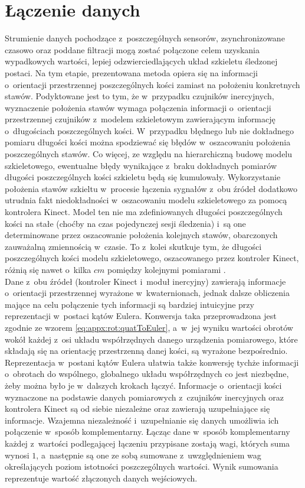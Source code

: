 \section{Łączenie danych}

Strumienie danych pochodzące z~poszczegółnych sensorów, zsynchronizowane czasowo oraz poddane filtracji mogą zostać połączone celem uzyskania wypadkowych wartości, lepiej odzwierciedlających układ szkieletu śledzonej postaci. Na tym etapie, prezentowana metoda opiera się na informacji o~orientacji przestrzennej poszczególnych kości zamiast na położeniu konkretnych stawów. Podyktowane jest to tym, że w~przypadku czujników inercyjnych, wyznaczenie położenia stawów wymaga połączenia informacji o~orientacji przestrzennej czujników z~modelem szkieletowym zawierającym informację o~długościach poszczególnych kości. W~przypadku błędnego lub nie dokładnego pomiaru długości kości można spodziewać się błędów w~oszacowaniu położenia poszczególnych stawów. Co więcej, ze względu na hierarchiczną budowę modelu szkieletowego, ewentualne błędy wynikające z~braku dokładnych pomiarów długości poszczególnych kości szkieletu będą się kumulowały. 
Wykorzystanie położenia stawów szkieltu w~procesie łączenia sygnałów z~obu źródeł dodatkowo utrudnia fakt niedokładności w~oszacowaniu modelu szkieletowego za pomocą kontrolera Kinect. Model ten nie ma zdefiniowanych długości poszczególnych kości na stałe (choćby na czas pojedynczej sesji śledzenia) i~są one determinowane przez oszacowanie położenia kolejnych stawów, obarczonych zauważalną zmiennością w~czasie. To z~kolei skutkuje tym, że długości poszczególnych kości modelu szkieletowego, oszacowanego przez kontroler Kinect, różnią się nawet o~kilka $cm$ pomiędzy kolejnymi pomiarami .\\

Dane z~obu źródeł (kontroler Kinect i~moduł inercyjny) zawierają informacje o~orientacji przestrzennej wyrażone w~kwaternionach, jednak dalsze obliczenia mające na celu połączenie tych informacji są bardziej intuicyjne przy reprezentacji w~postaci kątów Eulera. Konwersja taka przeprowadzona jest zgodnie ze wzorem \ref{eq:appx:rot:quatToEuler}, a~w~jej wyniku wartości obrotów wokół każdej z~osi układu współrzędnych danego urządzenia pomiarowego, które składają się na orientację przestrzenną danej kości, są wyrażone bezpośrednio. Reprezentacja w~postani kątów Eulera ułatwia także konwersję tychże informacji o~obrotach do wspólnego, globalnego układu współrzędnych co jest niezbędne, żeby można było je w~dalszych krokach łączyć. 
Informacje o~orientacji kości wyznaczone na podstawie danych pomiarowych z~czujników inercyjnych oraz kontrolera Kinect są od siebie niezależne oraz zawierają uzupełniające się informacje. Wzajemna niezależność i~uzupełnianie się danych umożliwia ich połączenie w~sposób komplementarny. Łącząc dane w~sposób komplementarny każdej z~wartości podlegającej łączeniu przypisane zostają wagi, których suma wynosi $1$, a~następnie są one ze sobą sumowane z~uwzględnieniem wag określających poziom istotności poszczególnych wartości. Wynik sumowania reprezentuje wartość złączonych danych wejściowych. \\
 

